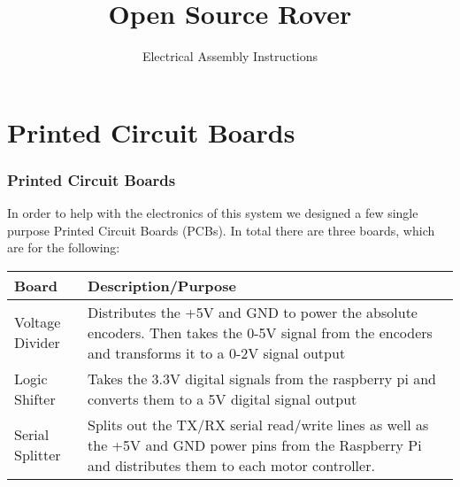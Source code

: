 \documentclass[12pt]{article}
\begin{document}
\title{Open Source Rover}
\author{Electrical Assembly Instructions}

\makeatletter         
\def\@maketitle{
\begin{center}	
	\makebox[\textwidth][c]{ \texttt{[image: "Pictures/pcb title".png]}}
	{\Huge \bfseries \sffamily \@title }\\[4ex] 
	{\huge \bfseries \sffamily \@author}\\[4ex] 
	\texttt{[image: "Pictures/Electronics/JPL logo".png]}
\end{center}}
\makeatother

\maketitle

\newpage


\tableofcontents

\newpage




\section{Printed Circuit Boards}

\subsubsection{Printed Circuit Boards}
In order to help with the electronics of this system we designed a few single purpose Printed Circuit Boards (PCBs). In total there are three boards, which are for the following:
\bigskip

\begin{tabular}[2]{| p{5cm} | p{10cm} | }
	\hline
	\textbf{Board} & \textbf{Description/Purpose} \\ \hline
	Voltage Divider & Distributes the +5V and GND to power the absolute encoders. Then takes the 0-5V signal from the encoders and transforms it to a 0-2V signal output \\ \hline
	Logic Shifter & Takes the 3.3V digital signals from the raspberry pi and converts them to a 5V digital signal output \\ \hline
	Serial Splitter & Splits out the TX/RX serial read/write lines as well as the +5V and GND power pins from the Raspberry Pi and distributes them to each motor controller. \\ \hline
\end{tabular}
\bigskip
\end{document}
